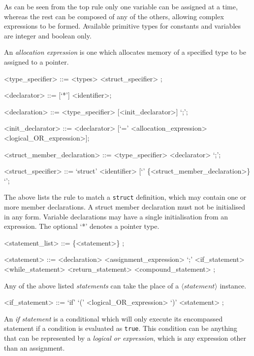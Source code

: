 \documentclass[a4paper,11pt]{article}
\begin{document}
As can be seen from the top rule only one variable can be assigned at a time, whereas the rest can be composed of any of the others, allowing complex expressions to be formed.
Available primitive types for constants and variables are integer and boolean only.

An \textit{allocation expression} is one which allocates memory of a specified type to be assigned to a pointer.

\begin{grammar}
        <type_specifier> ::=
                <types>
            \alt   <struct_specifier>
            ;

        <declarator> ::= [`*'] <identifier>;
        
	<declaration> ::= <type_specifier> [<init_declarator>] `;';

        <init_declarator> ::= <declarator>
        [`=' <allocation_expression>
        \alt <logical_OR_expression>];


        <struct_member_declaration> ::= <type_specifier> <declarator> `;';

        <struct_specifier> ::=
                `struct' <identifier> [`{' \{<struct_member_declaration>\} `}';
\end{grammar}
The above lists the rule to match a \verb+struct+ definition, which may contain one or more member declarations.
A struct member declaration must not be initialised in any form.
Variable declarations may have a single initialisation from an expression.
The optional `*' denotes a pointer type.

\begin{grammar}
<statement_list> ::=
    \{<statement>\}
    ;

<statement> ::=
	<declaration>
    \alt   <assignment_expression> `;'
    \alt   <if_statement>
    \alt   <while_statement>
    \alt   <return_statement>
    \alt   <compound_statement>
    ;
\end{grammar}

Any of the above listed \textit{statements} can take the place of a $\langle statement\rangle$ instance.

\begin{grammar}
<if_statement> ::=
	`if'
       `('
       <logical_OR_expression>
       `)'
       <statement>
    ;
\end{grammar}

An \textit{if statement} is a conditional which will only execute its encompassed statement if a condition is evaluated as \verb+true+.
This condition can be anything that can be represented by a \textit{logical or expression}, which is any expression other than an assignment.
\end{document}
